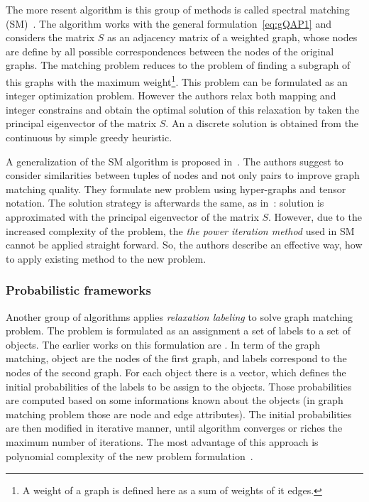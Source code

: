 The more resent algorithm is this group of methods is called spectral matching (SM)~\cite{Leordeanu2005_SM}. The algorithm works with the general formulation~\eqref{eq:gQAP1} and considers the matrix $S$ as an adjacency matrix of a weighted graph, whose nodes are define by all possible correspondences between the nodes of the original graphs. The matching problem reduces to the problem of finding a subgraph of this graphs with the maximum weight\footnote{A weight of a graph is defined here as a sum of weights of it edges.}. This problem can be formulated as an integer optimization problem. However the authors relax both mapping and integer constrains and obtain the optimal solution of this relaxation by taken the principal eigenvector of the matrix $S$. An a discrete solution is obtained from the continuous by simple greedy heuristic. 

A generalization of the SM algorithm is proposed in~\cite{Duchenne2011}. The authors suggest to consider similarities between tuples of nodes and not only pairs to improve graph matching quality. They formulate new problem using hyper-graphs and tensor notation. The solution strategy is afterwards the same, as in~\cite{Leordeanu2005_SM}: solution is approximated with the principal eigenvector of the matrix $S$. However, due to the increased complexity of the problem, the \emph{the power iteration method} used in SM cannot be applied straight forward. So, the authors describe an effective way, how to apply existing method to the new problem.

\subsubsection{Probabilistic frameworks}
Another group of algorithms applies \emph{relaxation labeling} to solve graph matching problem. The problem is formulated as an assignment a set of labels to a set of objects. The earlier works on this formulation are \cite{Fischler1973, Rosenfeld1976}. In term of the graph matching, object are the nodes of the first graph, and labels correspond to the nodes of the second graph. For each object there is a vector, which defines the initial probabilities of the labels to be assign to the objects. Those probabilities are computed based on some informations known about the objects (in graph matching problem those are node and edge attributes). The initial probabilities are then modified in iterative manner, until algorithm converges or riches the maximum number of iterations. 
The most advantage of this approach is polynomial complexity of the new problem formulation~\cite{Christmas1995}.

